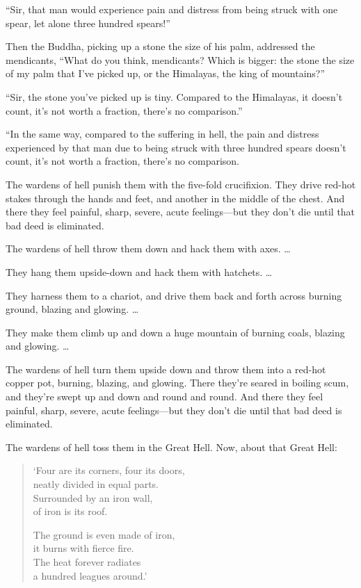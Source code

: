 \documentclass[12pt,openany]{book}%
\begin{document}
“Sir, that man would experience pain and distress from being struck with one spear, let alone three hundred spears!” 

Then the Buddha, picking up a stone the size of his palm, addressed the mendicants, “What do you think, mendicants? Which is bigger: the stone the size of my palm that I’ve picked up, or the Himalayas, the king of mountains?” 

“Sir, the stone you’ve picked up is tiny. Compared to the Himalayas, it doesn’t count, it’s not worth a fraction, there’s no comparison.” 

“In the same way, compared to the suffering in hell, the pain and distress experienced by that man due to being struck with three hundred spears doesn’t count, it’s not worth a fraction, there’s no comparison. 

The wardens of hell punish them with the five-fold crucifixion. They drive red-hot stakes through the hands and feet, and another in the middle of the chest. And there they feel painful, sharp, severe, acute feelings—but they don’t die until that bad deed is eliminated. 

The wardens of hell throw them down and hack them with axes. … 

They hang them upside-down and hack them with hatchets. … 

They harness them to a chariot, and drive them back and forth across burning ground, blazing and glowing. … 

They make them climb up and down a huge mountain of burning coals, blazing and glowing. … 

The wardens of hell turn them upside down and throw them into a red-hot copper pot, burning, blazing, and glowing. There they’re seared in boiling scum, and they’re swept up and down and round and round. And there they feel painful, sharp, severe, acute feelings—but they don’t die until that bad deed is eliminated. 

The wardens of hell toss them in the Great Hell. Now, about that Great Hell: 

\begin{verse}%
‘Four are its corners, four its doors, \\
neatly divided in equal parts. \\
Surrounded by an iron wall, \\
of iron is its roof. 

The ground is even made of iron, \\
it burns with fierce fire. \\
The heat forever radiates \\
a hundred leagues around.’ 

%
\end{verse}
\end{document}

